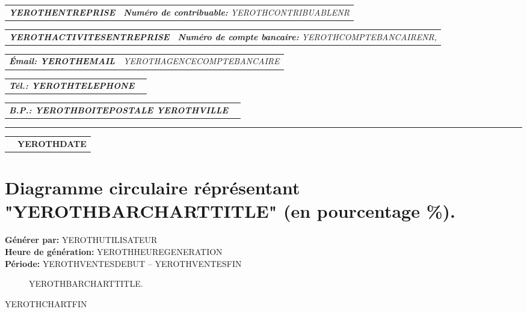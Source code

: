 \documentclass[11pt,YEROTHPAPERSPEC]{article} %
\makeatletter
\newcommand{\headerrow}[2]
{\begin{tabular*}{\linewidth}{l@{\extracolsep{\fill}}r}
	#1 &
	#2 \\
\end{tabular*}}
\newcommand{\emphbold}[1]{\textbf{\emph{#1}}\xspace}
\makeatother
\begin{document}
\bigskip

\headerrow
	{\emphbold{YEROTHENTREPRISE}}
	{\emph{\textbf{Num\'ero de contribuable:} YEROTHCONTRIBUABLENR}}
\headerrow
	{\emphbold{YEROTHACTIVITESENTREPRISE}}
	{\emph{\textbf{Num\'ero de compte bancaire:} YEROTHCOMPTEBANCAIRENR,}}
\headerrow
	{\emphbold{\'Email: YEROTHEMAIL}}
	{\emph{YEROTHAGENCECOMPTEBANCAIRE}}
\headerrow
	{\emphbold{T\'el.: YEROTHTELEPHONE}}
	{}
\headerrow
	{\emphbold{B.P.: YEROTHBOITEPOSTALE YEROTHVILLE}}
	{}
	
\hrule

\headerrow
	{}
	{\textbf{YEROTHDATE}}

\section*{Diagramme circulaire r\'epr\'esentant "YEROTHBARCHARTTITLE" (en pourcentage \%).}
\textbf{G\'en\'erer par:} YEROTHUTILISATEUR\\
\textbf{Heure de g\'en\'eration:} YEROTHHEUREGENERATION\\
\textbf{P\'eriode:} YEROTHVENTESDEBUT -- YEROTHVENTESFIN

\begin{figure}[!htbp]
\centering
{}
\caption{YEROTHBARCHARTTITLE.}
\end{figure}

YEROTHCHARTFIN\\
\end{document}
